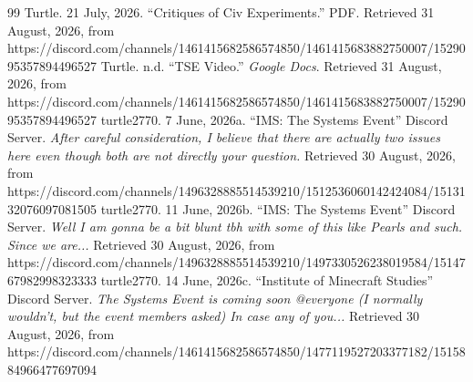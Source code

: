 {\begin{thebibliography}{99}
            Turtle. 21 July, 2026. “Critiques of Civ Experiments.” PDF. Retrieved 31 August, 2026, from https://discord.com/channels/1461415682586574850/1461415683882750007/1529095357894496527
            Turtle. n.d. “TSE Video.” \textit{Google Docs}. Retrieved 31 August, 2026, from https://discord.com/channels/1461415682586574850/1461415683882750007/1529095357894496527
            turtle2770. 7 June, 2026a. “IMS: The Systems Event” Discord Server. \textit{After careful consideration, I believe that there are actually two issues here even though both are not directly your question.} Retrieved 30 August, 2026, from https://discord.com/channels/1496328885514539210/1512536060142424084/1513132076097081505
            turtle2770. 11 June, 2026b. “IMS: The Systems Event” Discord Server. \textit{Well I am gonna be a bit blunt tbh with some of this like Pearls and such. Since we are...} Retrieved 30 August, 2026, from https://discord.com/channels/1496328885514539210/1497330526238019584/1514767982998323333
            turtle2770. 14 June, 2026c. “Institute of Minecraft Studies” Discord Server. \textit{The Systems Event is coming soon @everyone (I normally wouldn't, but the event members asked) In case any of you...} Retrieved 30 August, 2026, from https://discord.com/channels/1461415682586574850/1477119527203377182/1515884966477697094
        \end{thebibliography}
    }